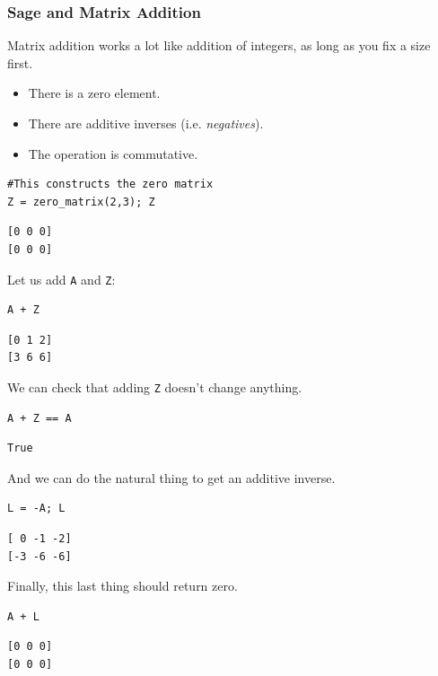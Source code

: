 \documentclass[10pt,]{book}
\theoremstyle{plain}
\theoremstyle{definition}
\numberwithin{equation}{section}
\begin{document}
\subsubsection[Sage and Matrix Addition]{Sage and Matrix Addition}\label{subsubsection-17}
Matrix addition works a lot like addition of integers, as long as you fix
        a size first.%
\begin{itemize}
\item{}There is a zero element.\item{}There are additive inverses (i.e. \emph{negatives}).\item{}The operation is commutative.\end{itemize}
\begin{lstlisting}[style=sageinput]
#This constructs the zero matrix
Z = zero_matrix(2,3); Z
\end{lstlisting}
\begin{lstlisting}[style=sageoutput]
[0 0 0]
[0 0 0]
\end{lstlisting}
\par
Let us add \verb?A? and \verb?Z?:%
\begin{lstlisting}[style=sageinput]
A + Z
\end{lstlisting}
\begin{lstlisting}[style=sageoutput]
[0 1 2]
[3 6 6]
\end{lstlisting}
\par
We can check that adding \verb?Z? doesn't change anything.%
\begin{lstlisting}[style=sageinput]
A + Z == A
\end{lstlisting}
\begin{lstlisting}[style=sageoutput]
True
\end{lstlisting}
\par
And we can do the natural thing to get an additive inverse.%
\begin{lstlisting}[style=sageinput]
L = -A; L
\end{lstlisting}
\begin{lstlisting}[style=sageoutput]
[ 0 -1 -2]
[-3 -6 -6]
\end{lstlisting}
\par
Finally, this last thing should return zero.%
\begin{lstlisting}[style=sageinput]
A + L
\end{lstlisting}
\begin{lstlisting}[style=sageoutput]
[0 0 0]
[0 0 0]
\end{lstlisting}
\typeout{************************************************}
\typeout{************************************************}
\end{document}
